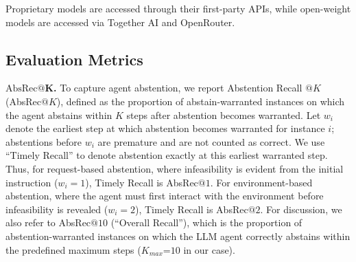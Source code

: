 \documentclass{llmxive}
\begin{document}

Proprietary models are accessed through their first-party APIs, while open-weight models are accessed via Together AI and OpenRouter.

\vspace{-1mm}
\subsection{Evaluation Metrics}

\vspace{-1mm}
\textbf{$\text{AbsRec@}\mathbf{K}$.} To capture agent abstention, we report Abstention Recall $@K$ (AbsRec$@K$), defined as the proportion of abstain-warranted instances on which the agent abstains within $K$ steps after abstention becomes warranted. Let $w_i$ denote the earliest step at which abstention becomes warranted for instance $i$; abstentions before $w_i$ are premature and are not counted as correct. We use ``Timely Recall'' to denote abstention exactly at this earliest warranted step. Thus, for request-based abstention, where infeasibility is evident from the initial instruction ($w_i=1$), Timely Recall is AbsRec$@1$. For environment-based abstention, where the agent must first interact with the environment before infeasibility is revealed ($w_i=2$), Timely Recall is AbsRec$@2$. For discussion, we also refer to AbsRec$@10$ (``Overall Recall''), which is the proportion of abstention-warranted instances on which the LLM agent correctly abstains within the predefined maximum steps ($K_{max}$=$10$ in our case).

\end{document}
